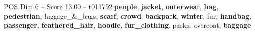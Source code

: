 \begin{textsample}{POS Dim 6 – Score 13.00 – t011792}  \label{ex:f6_pos_015}
\textbf{people}, \textbf{jacket}, \textbf{outerwear}, \textbf{bag}, \textbf{pedestrian}, luggage\_\&\_bags, \textbf{scarf}, \textbf{crowd}, \textbf{backpack}, \textbf{winter}, fur, \textbf{handbag}, \textbf{passenger}, \textbf{feathered\_hair}, \textbf{hoodie}, \textbf{fur\_clothing}, parka, overcoat, \textbf{baggage}

\end{textsample}
